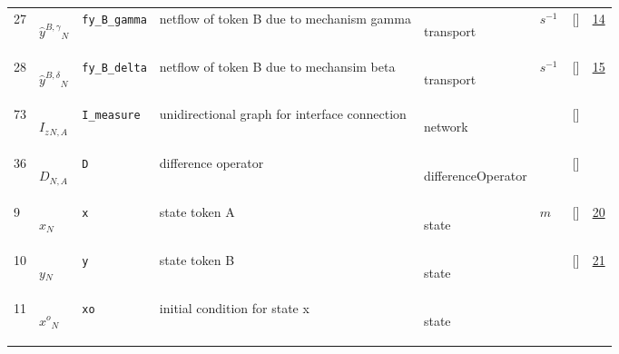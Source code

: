 \begin{longtable}{|p{1cm}|p{3cm}|p{3cm}|p{7cm}|p{3.0cm}|p{3cm}|p{2cm}|p{1cm}|}
                 \\
    27
             & \hypertarget{"v:27"}{ $ {{\hat{y}^{B,\gamma}}}{_{N}} $}
             & \verb|fy_B_gamma|
             & netflow of token B due to mechanism gamma
             & \begin{lay}transport \end{lay}
             & $ s^{-1} \, $
             & []
             & \hyperlink{"e:14"}{ 14 }
                 \\
    28
             & \hypertarget{"v:28"}{ $ {{\hat{y}^{B,\delta}}}{_{N}} $}
             & \verb|fy_B_delta|
             & netflow of token B due to mechansim beta
             & \begin{lay}transport \end{lay}
             & $ s^{-1} \, $
             & []
             & \hyperlink{"e:15"}{ 15 }
                 \\
    73
             & \hypertarget{"v:73"}{ $ {{I_z}}{_{N, A}} $}
             & \verb|I_measure|
             & unidirectional graph for interface connection
             & \begin{lay}network \end{lay}
             & $  $
             & []
             & \\
    36
             & \hypertarget{"v:36"}{ $ {D}{_{N, A}} $}
             & \verb|D|
             & difference operator 
             & \begin{lay}differenceOperator \end{lay}
             & $  $
             & []
             & \\
    9
             & \hypertarget{"v:9"}{ $ {x}{_{N}} $}
             & \verb|x|
             & state token A
             & \begin{lay}state \end{lay}
             & $ m  $
             & []
             & \hyperlink{"e:20"}{ 20 }
                 \\
    10
             & \hypertarget{"v:10"}{ $ {y}{_{N}} $}
             & \verb|y|
             & state token B
             & \begin{lay}state \end{lay}
             & $  $
             & []
             & \hyperlink{"e:21"}{ 21 }
                 \\
    11
             & \hypertarget{"v:11"}{ $ {{x^o}}{_{N}} $}
             & \verb|xo|
             & initial condition for state x
             & \begin{lay}state \end{lay}

\end{longtable}
